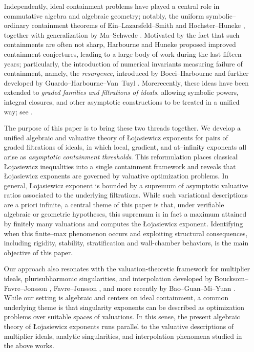\documentclass[12pt]{amsart}
\theoremstyle{plain}
\theoremstyle{definition}
\numberwithin{equation}{section}
\begin{document}
Independently, ideal containment problems have played a central role in commutative
algebra and algebraic geometry; notably, the uniform symbolic--ordinary containment theorems of
Ein--Lazarsfeld--Smith \cite{ELS} and Hochster--Huneke \cite{HochsterHuneke},
together with generalization by Ma--Schwede \cite{MaSchwede}.  Motivated by the
fact that such containments are often not sharp, Harbourne and Huneke
\cite{HarbourneHuneke} proposed improved containment conjectures, leading to a large body of work during the last fifteen years; particularly, the introduction of numerical invariants measuring failure of containment, namely, the \emph{resurgence}, introduced by Bocci--Harbourne \cite{BocciHarbourne} and further developed by Guardo--Harbourne--Van~Tuyl \cite{GuardoHarbourneVanTuyl}.  Morerecently, these ideas have been extended to \emph{graded families and filtrations of ideals}, allowing symbolic powers, integral closures, and other asymptotic constructions
to be treated in a unified way; see \cite{HaKumarNguyenNguyen}.

The purpose of this paper is to bring these two threads together.
We develop a unified algebraic and valuative theory of \L{}ojasiewicz
exponents for pairs of graded filtrations of ideals, in which local,
gradient, and at--infinity exponents all arise as \emph{asymptotic
	containment thresholds}.  This reformulation places classical
\L{}ojasiewicz inequalities into a single containment framework and
reveals that \L{}ojasiewicz exponents are governed by valuative
optimization problems.  
In general, \L{}ojasiewicz exponent is bounded by a supremum of asymptotic valuative
ratios associated to the underlying filtrations.  While such variational
descriptions are a priori infinite, a central theme of this paper is
that, under verifiable algebraic or geometric hypotheses, this
supremum is in fact a maximum attained by finitely many 
valuations and computes the \L{}ojasiewicz exponent.  Identifying when this finite--max phenomenon occurs and
exploiting structural consequences, including rigidity, stability, stratification and wall-chamber behaviors, is the main objective of this paper.

Our approach also resonates with the valuation-theoretic framework for multiplier ideals, plurisubharmonic singularities, and interpolation developed by Boucksom–Favre–Jonsson \cite{BFJ2008}, Favre–Jonsson \cite{FJ04,FJ05,FJ2005}, and more recently by Bao–Guan–Mi–Yuan \cite{BGMY2026a,BGMY2026b,BGMY2025}. While our setting is algebraic and centers on ideal containment, a common underlying theme is that singularity exponents can be described as optimization problems over suitable spaces of valuations. In this sense, the present algebraic theory of \L{}ojasiewicz exponents runs parallel to the valuative descriptions of multiplier ideals, analytic singularities, and interpolation phenomena studied in the above works.
\end{document}
